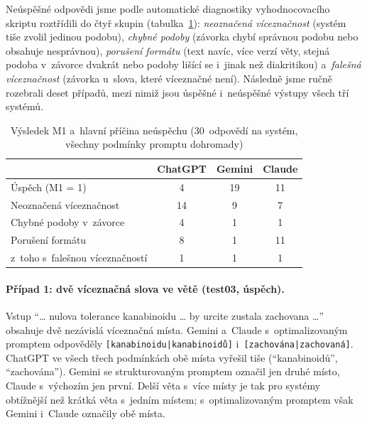 \documentclass[11pt,a4paper]{article}
\begin{document}
Neúspěšné odpovědi jsme podle automatické diagnostiky vyhodnocovacího
skriptu roztřídili do čtyř skupin (tabulka~\ref{tab:typy-chyb}):
\emph{neoznačená víceznačnost} (systém tiše zvolil jedinou podobu),
\emph{chybné podoby} (závorka chybí správnou podobu nebo obsahuje
nesprávnou), \emph{porušení formátu} (text navíc, více verzí věty,
stejná podoba v~závorce dvakrát nebo podoby lišící se i~jinak než
diakritikou) a~\emph{falešná víceznačnost} (závorka u~slova, které
víceznačné není). Následně jsme ručně rozebrali deset případů, mezi
nimiž jsou úspěšné i~neúspěšné výstupy všech tří systémů.

\begin{table}[htbp]
\centering
\small
\caption{Výsledek M1 a~hlavní příčina neúspěchu (30~odpovědí na systém,
všechny podmínky promptu dohromady)}
\label{tab:typy-chyb}
\begin{tabular}{@{}lccc@{}}
\toprule
 & ChatGPT & Gemini & Claude \\
\midrule
Úspěch (M1 = 1)               & 4  & 19 & 11 \\
Neoznačená víceznačnost       & 14 & 9  & 7  \\
Chybné podoby v~závorce       & 4  & 1  & 1  \\
Porušení formátu              & 8  & 1  & 11 \\
\midrule
z~toho s~falešnou víceznačností & 1 & 1 & 1 \\
\bottomrule
\end{tabular}
\end{table}

\paragraph{Případ 1: dvě víceznačná slova ve větě (test03, úspěch).}
Vstup \enquote{\dots{} nulova tolerance kanabinoidu \dots{} by urcite
zustala zachovana \dots} obsahuje dvě nezávislá víceznačná místa.
Gemini a~Claude s~optimalizovaným promptem odpověděly
\texttt{[kanabinoidu|kanabinoidů]} i~\texttt{[zachována|zachovaná]}.
ChatGPT ve všech třech podmínkách obě místa vyřešil tiše
(\enquote{kanabinoidů}, \enquote{zachována}). Gemini se strukturovaným
promptem označil jen druhé místo, Claude s~výchozím jen první. Delší
věta s~více místy je tak pro systémy obtížnější než krátká věta
s~jedním místem; s~optimalizovaným promptem však Gemini i~Claude
označily obě místa.
\end{document}
